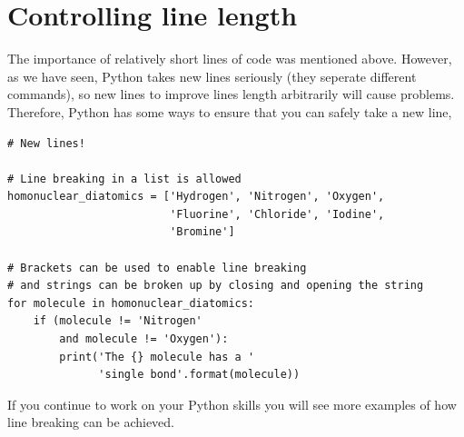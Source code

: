 \documentclass[a4paper]{article}
\begin{document}
\vspace{\baselineskip}
\begin{center}
	\noindent{}
\end{center}

\section{Controlling line length}
The importance of relatively short lines of code was mentioned above. 
However, as we have seen, Python takes new lines seriously (they seperate different commands), so new lines to improve lines length arbitrarily will cause problems. 
Therefore, Python has some ways to ensure that you can safely take a new line, 
\begin{lstlisting}
# New lines!

# Line breaking in a list is allowed
homonuclear_diatomics = ['Hydrogen', 'Nitrogen', 'Oxygen', 
                         'Fluorine', 'Chloride', 'Iodine', 
                         'Bromine']

# Brackets can be used to enable line breaking
# and strings can be broken up by closing and opening the string
for molecule in homonuclear_diatomics:
    if (molecule != 'Nitrogen' 
        and molecule != 'Oxygen'):
        print('The {} molecule has a '
              'single bond'.format(molecule))
\end{lstlisting}
If you continue to work on your Python skills you will see more examples of how line breaking can be achieved. 
\end{document}
